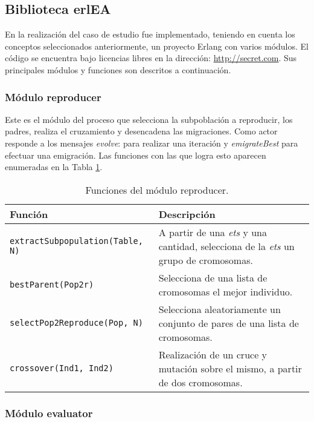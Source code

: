 \documentclass[runningheads]{llncs}
\begin{document}
\subsection{Biblioteca erlEA}

En la realización del caso de estudio fue implementado, teniendo en cuenta los conceptos seleccionados anteriormente, un proyecto Erlang con varios módulos. El código se encuentra bajo licencias libres en la dirección: \url{http://secret.com}. Sus principales módulos y funciones son descritos a continuación.


\subsubsection{Módulo reproducer}

Este es el módulo del proceso que selecciona la subpoblación a reproducir, los padres, realiza el cruzamiento y desencadena las migraciones. Como actor responde a los mensajes {\em evolve}: para realizar una iteración y {\em emigrateBest} para efectuar una emigración. Las funciones con las que logra esto aparecen enumeradas en la Tabla \ref{tb:reproducer}.

\begin{table}
  \centering
\begin{tabular}{|p{5cm}|p{7cm}|}
  \hline
   \textbf{Función} &  \textbf{Descripción} \\
  \hline
  {\tt extractSubpopulation(Table, N) } & A partir de una {\em ets} y una cantidad, selecciona de la {\em ets} un grupo de cromosomas. \\
  \hline
  {\tt bestParent(Pop2r)} & Selecciona de una lista de cromosomas el mejor individuo. \\
  \hline
 {\tt selectPop2Reproduce(Pop, N)} & Selecciona aleatoriamente un conjunto de pares de una lista de cromosomas. \\
  \hline
  {\tt crossover(Ind1, Ind2)} & Realización de un cruce y mutación sobre el mismo, a partir de dos cromosomas. \\
  \hline
\end{tabular}
  \caption{Funciones del módulo reproducer.}\label{tb:reproducer}
\end{table}


\subsubsection{Módulo evaluator}
\end{document}

